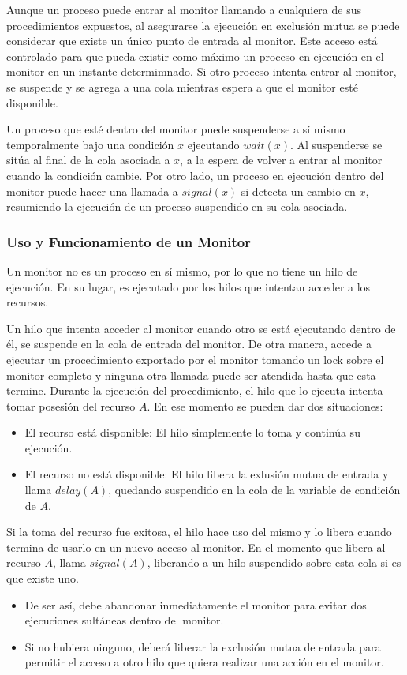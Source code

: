Aunque un proceso puede entrar al monitor llamando a cualquiera de sus
procedimientos expuestos, al asegurarse la ejecución en exclusión mutua se puede
considerar que existe un único punto de entrada al monitor. Este acceso está
controlado para que pueda existir como máximo un proceso en ejecución en el
monitor en un instante determimnado. Si otro proceso intenta entrar al monitor,
se suspende y se agrega a una cola mientras espera a que el monitor esté disponible.

Un proceso que esté dentro del monitor puede suspenderse a sí mismo
temporalmente bajo una condición $x$ ejecutando $wait(x)$. Al suspenderse se
sitúa al final de la cola asociada a $x$, a la espera de volver a entrar al
monitor cuando la condición cambie.
Por otro lado, un proceso en ejecución dentro del monitor puede hacer una
llamada a $signal(x)$ si detecta un cambio en $x$, resumiendo la ejecución de un
proceso suspendido en su cola asociada.

\subsubsection{Uso y Funcionamiento de un Monitor}
Un monitor no es un proceso en sí mismo, por lo que no tiene un hilo de
ejecución. En su lugar, es ejecutado por los hilos que intentan acceder a los
recursos.

Un hilo que intenta acceder al monitor cuando otro se está ejecutando dentro de
él, se suspende en la cola de entrada del monitor. 
De otra manera, accede a ejecutar un procedimiento exportado por el monitor
tomando un lock sobre el monitor completo y ninguna otra llamada puede ser
atendida hasta que esta termine. Durante la ejecución del procedimiento, el hilo
que lo ejecuta intenta tomar posesión del recurso $A$. En ese momento se pueden
dar dos situaciones:
\begin{itemize}
    \item El recurso está disponible: El hilo simplemente lo toma y continúa su
    ejecución.
    \item El recurso no está disponible: El hilo libera la exlusión mutua de
    entrada y llama $delay(A)$, quedando suspendido en la cola de la variable de
    condición de $A$.
\end{itemize}

Si la toma del recurso fue exitosa, el hilo hace uso del mismo y lo libera
cuando termina de usarlo {\color{red}en un nuevo acceso al monitor}. En el
momento que libera al recurso $A$, llama $signal(A)$, liberando a un hilo
suspendido sobre esta cola si es que existe uno.
\begin{itemize}
    \item De ser así, debe abandonar inmediatamente el monitor para evitar dos
    ejecuciones sultáneas dentro del monitor.
    \item Si no hubiera ninguno, deberá liberar la exclusión mutua de entrada
    para permitir el acceso a otro hilo que quiera realizar una acción en el
    monitor.
\end{itemize}

